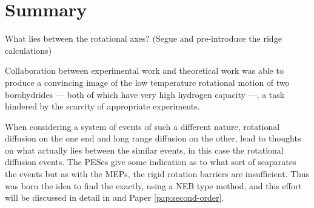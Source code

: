 \section{Summary}
\label{sec:borohydrides-summary}

\bit
\item What lies between the rotational axes? (Segue and pre-introduce the ridge calculations)
\eit

\incomplete

Collaboration between experimental work and theoretical work was able to produce a convincing image of the low temperature rotational motion of two borohydrides --- both of which have very high hydrogen capacity ---, a task hindered by the scarcity of appropriate experiments.

When considering a system of events of such a different nature, rotational diffusion on the one end and long range diffusion on the other, lead to thoughts on what actually lies between the similar events, in this case the rotational diffusion events.
The PESes give some indication as to what sort of  seaparates the events but as with the MEPs, the rigid rotation barriers are insufficient.
Thus was born the idea to find the  exactly, using a NEB type method, and this effort will be discussed in detail in  and Paper \ref{pap:second-order}.

